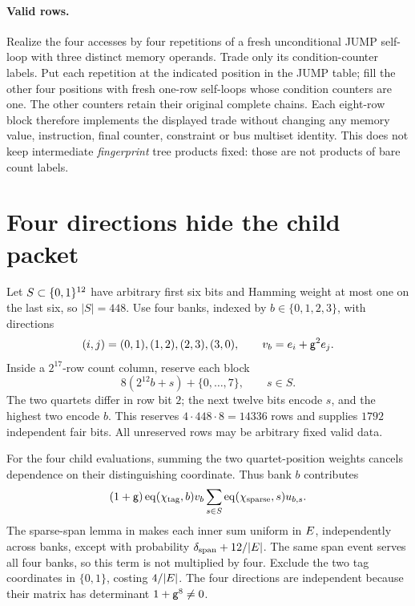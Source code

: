 \documentclass[11pt]{article}
\begin{document}
\paragraph{Valid rows.} Realize the four accesses by four repetitions of a fresh unconditional JUMP self-loop with three distinct memory operands. Trade only its condition-counter labels. Put each repetition at the indicated position in the JUMP table; fill the other four positions with fresh one-row self-loops whose condition counters are one. The other counters retain their original complete chains. Each eight-row block therefore implements the displayed trade without changing any memory value, instruction, final counter, constraint or bus multiset identity. This does not keep intermediate \emph{fingerprint} tree products fixed: those are not products of bare count labels.

\section{Four directions hide the child packet}

Let $S\subset\{0,1\}^{12}$ have arbitrary first six bits and Hamming weight at most one on the last six, so $|S|=448$. Use four banks, indexed by $b\in\{0,1,2,3\}$, with directions
\[
 (i,j)=(0,1),(1,2),(2,3),(3,0),
 \qquad v_b=e_i+\mathsf{g}^2e_j.
\]
Inside a $2^{17}$-row count column, reserve each block
\[
 8(2^{12}b+s)+\{0,\ldots,7\},\qquad s\in S.
\]
The two quartets differ in row bit $2$; the next twelve bits encode $s$, and the highest two encode $b$. This reserves $4\cdot448\cdot8=14336$ rows and supplies $1792$ independent fair bits. All unreserved rows may be arbitrary fixed valid data.

For the four child evaluations, summing the two quartet-position weights cancels dependence on their distinguishing coordinate. Thus bank $b$ contributes
\[
 (1+\mathsf{g})\operatorname{eq}(\chi_{\mathrm{tag}},b)v_b
 \sum_{s\in S}\operatorname{eq}(\chi_{\mathrm{sparse}},s)u_{b,s}.
\]
The sparse-span lemma in  makes each inner sum uniform in $E$, independently across banks, except with probability $\delta_{\mathrm{span}}+12/|E|$. The same span event serves all four banks, so this term is not multiplied by four. Exclude the two tag coordinates in $\{0,1\}$, costing $4/|E|$. The four directions are independent because their matrix has determinant $1+\mathsf{g}^8\ne0$.
\end{document}
